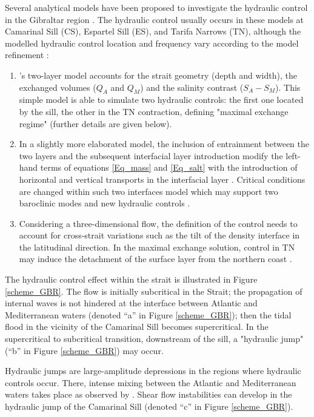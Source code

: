 Several analytical models have been proposed to investigate the hydraulic control in the Gibraltar region \citep{BS84,FA1986,Garett90}. The hydraulic control usually occurs in these models at Camarinal Sill (CS), Espartel Sill (ES), and Tarifa Narrows (TN), although the modelled hydraulic control location and frequency vary according to the model refinement :

\begin{enumerate}
\item{\citet{FA1986}'s two-layer model accounts for the strait geometry (depth and width), the exchanged volumes ($Q_A$ and $Q_M$) and the salinity contrast ($S_A -S_M$). This simple model is able to simulate two hydraulic controls: the first one located by the sill, the other in the TN contraction, defining "maximal exchange regime"  (further details are given below). }
\item{In a slightly more elaborated model, the inclusion of entrainment between the two layers and the subsequent interfacial layer introduction modify the left-hand terms of equations \ref{Eq_mass} and \ref{Eq_salt} with the introduction of horizontal and vertical transports in the interfacial layer \citep{Bray95}.  Critical conditions are changed within such two interfaces model which may support two baroclinic modes and new hydraulic controls \citep{Sannino2009b}.}
\item{Considering a three-dimensional flow, the definition of the control needs to account for cross-strait variations such as the tilt of the density interface in the latitudinal direction. In the maximal exchange solution, control in TN may induce the detachment of the surface layer from the northern coast \citep{Sannino2009b}.}
\end{enumerate}

The hydraulic control effect within the strait is illustrated in Figure \ref{scheme_GBR}. The flow is initially subcritical in the Strait; the propagation of internal waves is not hindered at the interface between Atlantic and Mediterranean waters (denoted ``a'' in Figure \ref{scheme_GBR}); then the tidal flood in the vicinity of the Camarinal Sill becomes supercritical. In the supercritical to subcritical transition, downstream of the sill, a "hydraulic jump" (``b'' in Figure \ref{scheme_GBR}) may occur.

Hydraulic jumps are large-amplitude depressions in the regions where hydraulic controls occur. There, intense mixing between the Atlantic and Mediterranean waters takes place as observed by \citet{wesson_1994}. Shear flow instabilities can develop in the hydraulic jump of the Camarinal Sill (denoted ``c'' in Figure \ref{scheme_GBR}). 

